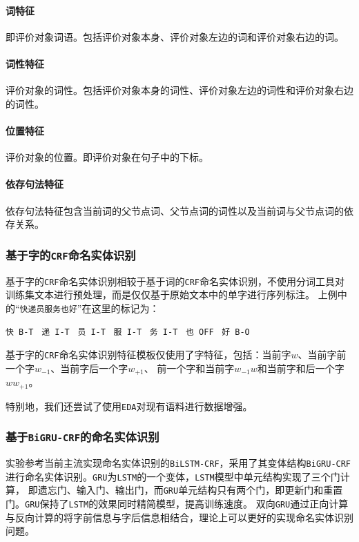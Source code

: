 \documentclass[11pt,a4paper]{article}
\begin{document}
\paragraph{词特征} 即评价对象词语。包括评价对象本身、评价对象左边的词和评价对象右边的词。
\paragraph{词性特征} 评价对象的词性。包括评价对象本身的词性、评价对象左边的词性和评价对象右边的词性。
\paragraph{位置特征} 评价对象的位置。即评价对象在句子中的下标。
\paragraph{依存句法特征} 依存句法特征包含当前词的父节点词、父节点词的词性以及当前词与父节点词的依存关系。

\subsubsection{基于字的\texttt{CRF}命名实体识别}

基于字的\texttt{CRF}命名实体识别相较于基于词的\texttt{CRF}命名实体识别，不使用分词工具对训练集文本进行预处理，而是仅仅基于原始文本中的单字进行序列标注。
上例中的“\texttt{快递员服务也好}”在这里的标记为：

  \texttt{快\ B-T} \ 
  \texttt{递\ I-T} \ 
  \texttt{员\ I-T} \ 
  \texttt{服\ I-T} \ 
  \texttt{务\ I-T} \ 
  \texttt{也\ OFF} \ 
  \texttt{好\ B-O} \ 

基于字的\texttt{CRF}命名实体识别特征模板仅使用了字特征，包括：当前字$w$、当前字前一个字$w_{-1}$、当前字后一个字$w_{+1}$、
前一个字和当前字$w_{-1}w$和当前字和后一个字$ww_{+1}$。

特别地，我们还尝试了使用\texttt{EDA}对现有语料进行数据增强\cite{wei2019eda}。

\subsubsection{基于\texttt{BiGRU-CRF}的命名实体识别}

实验参考当前主流实现命名实体识别的\texttt{BiLSTM-CRF}，采用了其变体结构\texttt{BiGRU-CRF}进行命名实体识别\cite{xu2019key}。\texttt{GRU}为\texttt{LSTM}的一个变体，\texttt{LSTM}模型中单元结构实现了三个门计算，
即遗忘门、输入门、输出门，而\texttt{GRU}单元结构只有两个门，即更新门和重置门。\texttt{GRU}保持了\texttt{LSTM}的效果同时精简模型，提高训练速度。
双向\texttt{GRU}通过正向计算与反向计算的将字前信息与字后信息相结合，理论上可以更好的实现命名实体识别问题。
\end{document}
